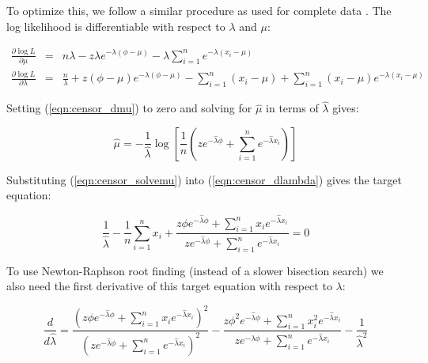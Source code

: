 To optimize this, we follow a similar procedure as used for complete
data \citep{Lawless82}. The log likelihood is differentiable with
respect to $\lambda$ and $\mu$:

\begin{eqnarray}
\frac{\partial \log L}{\partial \mu} & = &
n \lambda  
- z \lambda e^{-\lambda (\phi - \mu)}
- \lambda \sum_{i=1}^{n} e^{-\lambda (x_i - \mu)}
\label{eqn:censor_dmu}
\\%
\frac{\partial \log L}{\partial \lambda} & = &
\frac{n}{\lambda} 
+ z (\phi - \mu) e^{-\lambda (\phi - \mu)}
- \sum_{i=1}^{n} (x_i - \mu) 
+ \sum_{i=1}^{n} (x_i - \mu) e^{-\lambda (x_i - \mu)}
\label{eqn:censor_dlambda}
\end{eqnarray}

Setting (\ref{eqn:censor_dmu}) to zero and solving for $\hat{\mu}$ in
terms of $\hat{\lambda}$ gives:

\begin{equation}
\hat{\mu}  =  - \frac{1}{\hat{\lambda}} 
	\log \left[ \frac{1}{n} 
	\left( z e^{-\hat{\lambda} \phi} 
               + \sum_{i=1}^{n} e^{-\hat{\lambda} x_i} \right)
	\right]
\label{eqn:censor_solvemu}
\end{equation}

Substituting (\ref{eqn:censor_solvemu}) into
(\ref{eqn:censor_dlambda}) gives the target equation:

\begin{equation}
\frac{1}{\hat{\lambda}} 
- \frac{1}{n} \sum_{i=1}^{n} x_i +
\frac{z \phi e^{-\hat{\lambda} \phi} + \sum_{i=1}^{n} x_i e^{-\hat{\lambda} x_i}} 
     {z e^{-\hat{\lambda} \phi} + \sum_{i=1}^{n} e^{-\hat{\lambda} x_i}} 
 =  0
\label{eqn:censor_newtontarget}
\end{equation}

To use Newton-Raphson root finding (instead of a slower bisection
search) we also need the first derivative of this target equation with
respect to $\lambda$:

\begin{equation}
\frac{d}{d\hat{\lambda}} = 
\frac{\left( 
        z \phi e^{-\hat{\lambda} \phi}
        + \sum_{i=1}^{n} x_i e^{-\hat{\lambda} x_i} 
       \right)^2 } 
     {\left( 
        z e^{-\hat{\lambda} \phi}
        + \sum_{i=1}^{n} e^{-\hat{\lambda} x_i}     
       \right)^2 }
-
\frac{z \phi^2 e^{-\hat{\lambda} \phi} + \sum_{i=1}^{n} x_i^2 e^{-\hat{\lambda} x_i}}
     {z  e^{-\hat{\lambda} \phi} + \sum_{i=1}^{n} e^{-\hat{\lambda} x_i}}
-
\frac{1}{\hat{\lambda}^2}
\label{eqn:censor_newtonderiv}
\end{equation}

